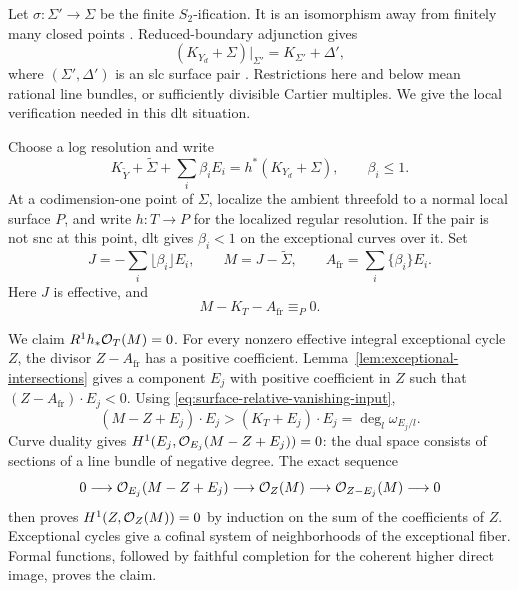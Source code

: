 Let \(\sigma:\Sigma'\to\Sigma\) be the finite \(S_2\)-ification.
It is an isomorphism away from finitely many closed points
\cite[Proposition~2.14]{xu2026}.
Reduced-boundary adjunction gives
\begin{equation}
\label{eq:slc-adjunction}
 (K_{Y_d}+\Sigma)|_{\Sigma'}=K_{\Sigma'}+\Delta',
\end{equation}
where \((\Sigma',\Delta')\) is an slc surface pair
\cite[Lemma~2.19]{xu2026}.
Restrictions here and below mean rational line bundles, or sufficiently
divisible Cartier multiples.  We give the local verification needed
in this dlt situation.

Choose a log resolution and write
\begin{equation}
\label{eq:boundary-log-pullback}
 K_{\widetilde Y}+\widetilde\Sigma+\sum_i\beta_iE_i
   =h^*(K_{Y_d}+\Sigma),\qquad \beta_i\leq1.
\end{equation}
At a codimension-one point of \(\Sigma\), localize the ambient threefold
to a normal local surface \(P\), and write \(h:T\to P\) for the
localized regular resolution.  If the pair is not snc at this point,
dlt gives \(\beta_i<1\) on the exceptional curves over it.
Set
\[
 J=-\sum_i\lfloor\beta_i\rfloor E_i,\qquad
 M=J-\widetilde\Sigma,\qquad
 A_{\mathrm{fr}}=\sum_i\{\beta_i\}E_i.
\]
Here \(J\) is effective, and
\begin{equation}
\label{eq:surface-relative-vanishing-input}
 M-K_T-A_{\mathrm{fr}}\equiv_P0 .
\end{equation}

We claim \(R^1h_*\mathcal O_T(M)=0\).
For every nonzero effective integral exceptional cycle \(Z\), the divisor
\(Z-A_{\mathrm{fr}}\) has a positive coefficient.
Lemma~\ref{lem:exceptional-intersections} gives a component \(E_j\) with
positive coefficient in \(Z\) such that
\((Z-A_{\mathrm{fr}})\cdot E_j<0\).
Using \eqref{eq:surface-relative-vanishing-input},
\[
 (M-Z+E_j)\cdot E_j>(K_T+E_j)\cdot E_j
   =\deg_l\omega_{E_j/l}.
\]
Curve duality gives
\(H^1(E_j,\mathcal O_{E_j}(M-Z+E_j))=0\):
the dual space consists of sections of a line bundle of negative degree.
The exact sequence
\[
 0\longrightarrow\mathcal O_{E_j}(M-Z+E_j)
 \longrightarrow\mathcal O_Z(M)
 \longrightarrow\mathcal O_{Z-E_j}(M)\longrightarrow0
\]
then proves \(H^1(Z,\mathcal O_Z(M))=0\) by induction on the sum of
the coefficients of \(Z\).
Exceptional cycles give a cofinal system of neighborhoods of the
exceptional fiber.  Formal functions, followed by faithful completion
for the coherent higher direct image, proves the claim.

